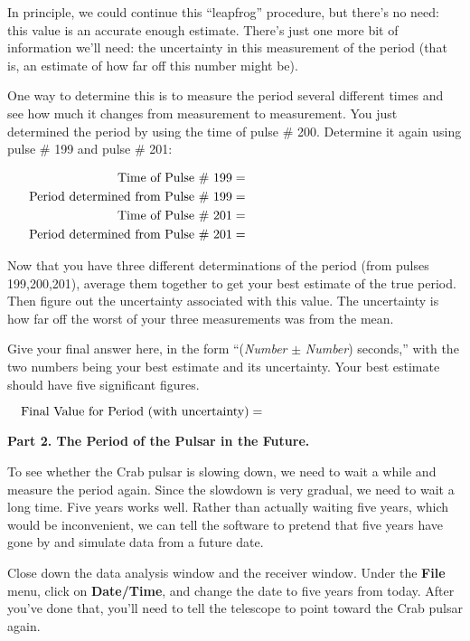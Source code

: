 In principle, we could continue this ``leapfrog'' procedure, but
there's no need: this value is an accurate enough estimate.  There's
just one more bit of information we'll need: the uncertainty in this
measurement of the period (that is, an estimate of how far off
this number might be).  

One way to determine this is to measure the period several different times
and see how much it changes from measurement to measurement.  You
just determined the period by using the time of pulse \# 200.  
Determine it again using pulse \# 199 and pulse \# 201:

\medskip
\begin{eqnarray*}
\mbox{Time of Pulse \# 199}&=&\hbox to 2in{}\\
\mbox{Period determined from Pulse \# 199}&=&\hbox to 2in{}\\
\mbox{Time of Pulse \# 201}&=&\hbox to 2in{}\\
\mbox{Period determined from Pulse \# 201}&=&\hbox to 2in{}\\
\end{eqnarray*}
\medskip

Now that you have three different determinations of the period (from pulses
199,200,201), average them together to get your best estimate of the
true period.  Then figure out the uncertainty associated with this
value.  The uncertainty is how far off the worst of your three
measurements was from the mean.

Give your final answer here, in the form ``({\it Number} $\pm$ {\it Number}) seconds,''  with the two numbers being your
best estimate and its uncertainty.  Your best estimate should have five
significant figures.

\medskip
$$
\mbox{Final Value for Period (with uncertainty)}=\hbox to 2in{}
$$

\bigskip\bigskip

{\bf Part 2. The Period of the Pulsar in the Future.}

To see whether the Crab pulsar is slowing down, we need to wait
a while and measure the period again.  Since the slowdown is very
gradual, we need to wait a long time.  Five years works well.
Rather than actually waiting five years, which would be inconvenient,
we can tell the software to pretend that five years have gone by
and simulate data from a future date.

Close down the data analysis window and the receiver window.  Under
the {\bf File} menu, click on {\bf Date/Time}, and change the date to
five years from today.  After you've done that, you'll need to tell
the telescope to point toward the Crab pulsar again.

